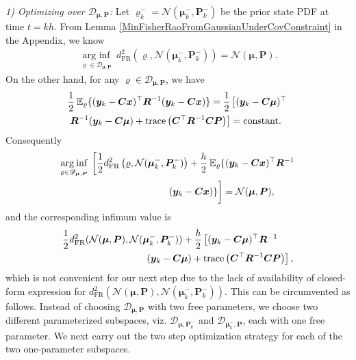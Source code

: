 \documentclass[letterpaper,10pt,twocolumn,conference]{ieeeconf}
\newcommand{\cD}{{\mathscr{D}}}
\newcommand{\bbx}{{\bm{x}}}
\newcommand{\bby}{{\bm{y}}}
\newcommand{\bmu}{\bm{\mu}}
\newcommand{\bbmu}{\bm{\mu}}
\newcommand{\bbP}{{\bm{P}}}
\newcommand{\bbR}{\bm{R}}
\newcommand{\bbC}{\bm{C}}
\newcommand{\tr}{\operatorname{trace}}
\newcommand{\arginf}{\operatorname{arg\:inf}}
\newcommand{\dFR}{d_{\mathrm{FR}}}
\begin{document}
{\em 1) Optimizing over $\cD_{\bmu,\bbP}$:}
Let $\varrho_{k}^{-}=\mathcal{N}(\bmu_{k}^{-},\bbP_{k}^{-})$ be the prior state PDF at time $t=kh$. From Lemma \ref{MinFisherRaoFromGaussianUnderCovConstraint} in the Appendix, we know
\begin{eqnarray}
\underset{\varrho\in\cD_{\bmu,\bbP}}{\arginf} \: \dFR^{2}\left(\varrho,\mathcal{N}(\bmu_{k}^{-},\bbP_{k}^{-})\right) = \mathcal{N}(\bmu,\bbP).
\label{minFRoverDmuP}	
\end{eqnarray}
On the other hand, for any $\varrho\in\cD_{\bmu,\bbP}$, we have
{\small{\begin{align}
&\frac{1}{2}\:\mathbb{E}_{\varrho}\{(\bby_{k} - \bbC\bbx)^{\top} \bbR^{-1} (\bby_{k} - \bbC\bbx)\} = \frac{1}{2}\vphantom{\tr\left(\bbC^{\top}\bbR^{-1}\bbC\bbP\right)}\left[(\bby_{k} - \bbC\bbmu)^{\top} \right.\nonumber\\
&\left.\bbR^{-1}(\bby_{k} - \bbC\bbmu)+\tr\left(\bbC^{\top}\bbR^{-1}\bbC\bbP\right)\right] = \text{constant}.
\label{ConstPhi}	
\end{align}}}
Consequently
{\small{\begin{align}
	&\underset{\varrho\in\cD_{\bmu,\bbP}}{\arginf} \: \vphantom{}\left[\frac{1}{2}\dFR^{2}\left(\varrho,\mathcal{N}(\bmu_{k}^{-},\bbP_{k}^{-})\right) + \frac{h}{2}\:\mathbb{E}_{\varrho}\{(\bby_{k}  - \bbC\bbx)^{\top} \bbR^{-1} \right.\nonumber\\
	& \hspace*{3.9cm} \left.(\bby_{k} - \bbC\bbx)\}\vphantom{\frac{h}{2}\:\mathbb{E}_{\varrho}\{(\bby_{k}  - \bbC\bbx)^{\top} \bbR^{-1}}\right] = \mathcal{N}(\bbmu,\bbP),
\label{arginfcombined}
\end{align}}}
and the corresponding infimum value is
{\small{\begin{align*}
&\frac{1}{2}\dFR^{2}(\mathcal{N}(\bmu,\bbP),\mathcal{N}(\bmu_{k}^{-},\bbP_{k}^{-})) + \frac{h}{2}\left[(\bby_{k} - \bbC\bbmu)^{\top}\bbR^{-1}\right.\nonumber\\
& \left.\hspace*{3cm}(\bby_{k} - \bbC\bbmu)+\tr\left(\bbC^{\top}\bbR^{-1}\bbC\bbP\right)\right],	
\end{align*}}}
\!\!\!\!\!\!which is not convenient for our next step due to the lack of availability of closed-form expression for $\dFR^{2}(\mathcal{N}(\bmu,\bbP),\mathcal{N}(\bmu_{k}^{-},\bbP_{k}^{-}))$. This can be circumvented as follows. Instead of choosing $\cD_{\bmu,\bbP}$ with two free parameters, we choose two different parameterized subspaces, viz. $\cD_{\bmu,\bbP_{k}^{-}}$ and $\cD_{\bmu_{k}^{-},\bbP}$, each with one free parameter. We next carry out the two step optimization strategy for each of the two one-parameter subspaces.
\end{document}
